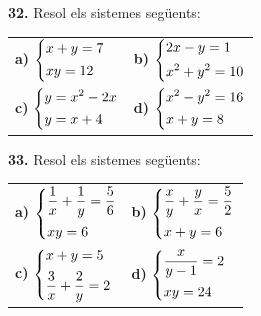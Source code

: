 \documentclass[13pt,a4paper]{extarticle}
\begin{document}
\par\noindent\begin{minipage}{\linewidth}
\textbf{32.} Resol els sistemes següents:\par

\vspace{5pt}
\begin{tabular}{@{}p{.46\linewidth}p{.46\linewidth}@{}}
\textbf{a)} $\begin{dcases}x+y=7\\[1pt]xy=12\end{dcases}$ & \textbf{b)} $\begin{dcases}2x-y=1\\[1pt]x^2+y^2=10\end{dcases}$ \\[20pt]
\textbf{c)} $\begin{dcases}y=x^2-2x\\[1pt]y=x+4\end{dcases}$ & \textbf{d)} $\begin{dcases}x^2-y^2=16\\[1pt]x+y=8\end{dcases}$ \\[20pt]
\end{tabular}\par
\end{minipage}\par\vspace{1.6mm}
\par\noindent\begin{minipage}{\linewidth}
\textbf{33.} Resol els sistemes següents:\par

\vspace{5pt}
\begin{tabular}{@{}p{.46\linewidth}p{.46\linewidth}@{}}
\textbf{a)} $\begin{dcases}\dfrac{1}{x}+\dfrac{1}{y}=\dfrac{5}{6}\\[1pt]xy=6\end{dcases}$ & \textbf{b)} $\begin{dcases}\dfrac{x}{y}+\dfrac{y}{x}=\dfrac{5}{2}\\[1pt]x+y=6\end{dcases}$ \\[20pt]
\textbf{c)} $\begin{dcases}x+y=5\\[1pt]\dfrac{3}{x}+\dfrac{2}{y}=2\end{dcases}$ & \textbf{d)} $\begin{dcases}\dfrac{x}{y-1}=2\\[1pt]xy=24\end{dcases}$ \\[20pt]
\end{tabular}\par
\end{minipage}\par\vspace{1.6mm}
\end{document}
